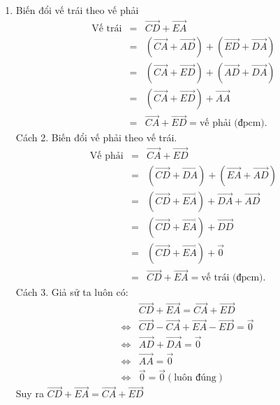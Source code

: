 \begin{bt}
{\begin{enumerate}
			Suy ra  $\overrightarrow{AB}+\overrightarrow{CD}+\overrightarrow{EA}=\overrightarrow{CB}+\overrightarrow{ED}$
			\item Biến đổi vế trái theo vế phải
			\begin{eqnarray*}
				\text{Vế trái}
				&=&\overrightarrow{CD}+\overrightarrow{EA}\\
				&=&\left(\overrightarrow{CA}+\overrightarrow{AD}\right)+\left(\overrightarrow{ED}+\overrightarrow{DA}\right)\\
				&=&\left(\overrightarrow{CA}+\overrightarrow{ED}\right)+\left(\overrightarrow{AD}+\overrightarrow{DA}\right)\\
				&=&\left(\overrightarrow{CA}+\overrightarrow{ED}\right)+\overrightarrow{AA}	\\
				&=&\overrightarrow{CA}+\overrightarrow{ED}=\text{vế phải (đpcm).}
			\end{eqnarray*}
			Cách 2. Biến đổi vế phải theo vế trái.
			\begin{eqnarray*}
				\text{Vế phải}
				&=&\overrightarrow{CA}+\overrightarrow{ED}\\
				&=&\left(\overrightarrow{CD}+\overrightarrow{DA}\right)+\left(\overrightarrow{EA}+\overrightarrow{AD}\right)\\
				&=&\left(\overrightarrow{CD}+\overrightarrow{EA}\right)+\overrightarrow{DA}+\overrightarrow{AD}\\
				&=&\left(\overrightarrow{CD}+\overrightarrow{EA}\right)+\overrightarrow{DD}\\
				&=&\left(\overrightarrow{CD}+\overrightarrow{EA}\right)+\overrightarrow{0}\\
				&=&\overrightarrow{CD}+\overrightarrow{EA}=\text{vế trái (đpcm).}
			\end{eqnarray*}
			Cách 3. Giả sử ta luôn có:
			\begin{eqnarray*}
				& &\overrightarrow{CD}+\overrightarrow{EA}=\overrightarrow{CA}+\overrightarrow{ED}\\
				&\Leftrightarrow& \overrightarrow{CD}-\overrightarrow{CA}+\overrightarrow{EA}-\overrightarrow{ED}=\overrightarrow{0}\\
				&\Leftrightarrow& \overrightarrow{AD}+\overrightarrow{DA}=\overrightarrow{0}\\
				& \Leftrightarrow& \overrightarrow{AA}=\overrightarrow{0}\\
				&\Leftrightarrow &\overrightarrow{0}=\overrightarrow{0} (\text{luôn đúng})
			\end{eqnarray*}
			Suy ra  $\overrightarrow{CD}+\overrightarrow{EA}=\overrightarrow{CA}+\overrightarrow{ED}$
		\end{enumerate}
	}
\end{bt}

